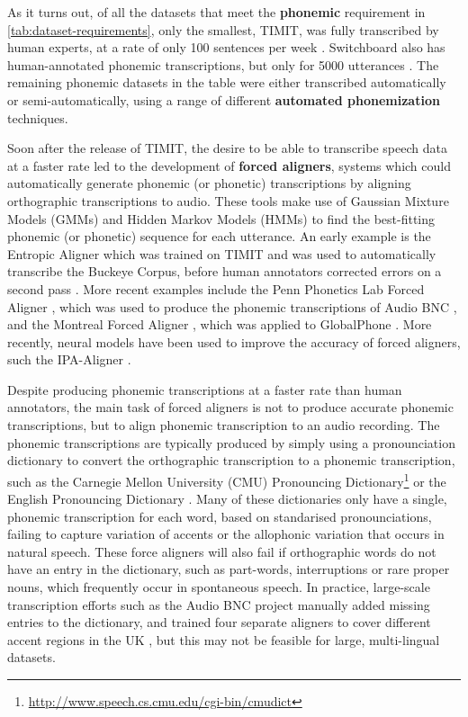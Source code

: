 As it turns out, of all the datasets that meet the \textbf{phonemic} requirement in \cref{tab:dataset-requirements}, only the smallest, TIMIT, was fully transcribed by human experts, at a rate of only 100 sentences per week \citep{zue1996transcription, lamel1989speech}. Switchboard also has human-annotated phonemic transcriptions, but only for 5000 utterances \citep{greenberg1996insights}. The remaining phonemic datasets in the table were either transcribed automatically or semi-automatically, using a range of different \textbf{automated phonemization} techniques.

Soon after the release of TIMIT, the desire to be able to transcribe speech data at a faster rate led to the development of \textbf{forced aligners}, systems which could automatically generate phonemic (or phonetic) transcriptions by aligning orthographic transcriptions to audio. These tools make use of Gaussian Mixture Models (GMMs) and Hidden Markov Models (HMMs) to find the best-fitting phonemic (or phonetic) sequence for each utterance. An early example is the Entropic Aligner \citep{wightman1997aligner} which was trained on TIMIT and was used to automatically transcribe the Buckeye Corpus, before human annotators corrected errors on a second pass \citep{PITT200589}. More recent examples include the Penn Phonetics Lab Forced Aligner \citep{yuan2008speaker}, which was used to produce the phonemic transcriptions of Audio BNC \citep{coleman2011miningb}, and the Montreal Forced Aligner \citep{mcauliffe2017montreal}, which was applied to GlobalPhone \citep{schultz2013globalphone}. More recently, neural models have been used to improve the accuracy of forced aligners, such the IPA-Aligner \citep{zhu-etal-2024-taste}.

Despite producing phonemic transcriptions at a faster rate than human annotators, the main task of forced aligners is not to produce accurate phonemic transcriptions, but to align phonemic transcription to an audio recording. The phonemic transcriptions are typically produced by simply using a pronounciation dictionary to convert the orthographic transcription to a phonemic transcription, such as the Carnegie Mellon University (CMU) Pronouncing Dictionary\footnote{\url{http://www.speech.cs.cmu.edu/cgi-bin/cmudict}} or the English Pronouncing Dictionary \citep{jones2011cambridge}. Many of these dictionaries only have a single, phonemic transcription for each word, based on standarised pronounciations, failing to capture variation of accents or the allophonic variation that occurs in natural speech. These force aligners will also fail if orthographic words do not have an entry in the dictionary, such as part-words, interruptions or rare proper nouns, which frequently occur in spontaneous speech. In practice, large-scale transcription efforts such as the Audio BNC project manually added missing entries to the dictionary, and trained four separate aligners to cover different accent regions in the UK \citep{coleman2011miningb}, but this may not be feasible for large, multi-lingual datasets. 

